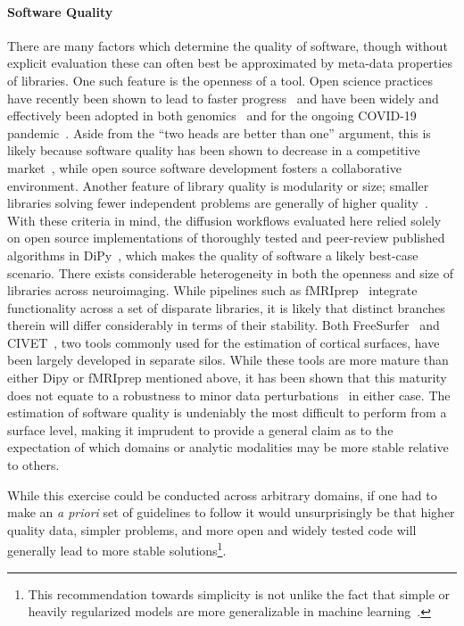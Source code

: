 \paragraph{Software Quality}
There are many factors which determine the quality of software, though without explicit evaluation these can often
best be approximated by meta-data properties of libraries. One such feature is the openness of a tool. Open science
practices have recently been shown to lead to faster progress~\cite{munafo2017manifesto} and have been widely and
effectively been adopted in both genomics~\cite{goecks2010galaxy} and for the ongoing COVID-19
pandemic~\cite{besanccon2020open}. Aside from the ``two heads are better than one'' argument, this is likely
because software quality has been shown to decrease in a competitive market~\cite{raghunathan2005open}, while open
source software development fosters a collaborative environment. Another feature of library quality is modularity
or size; smaller libraries solving fewer independent problems are generally of higher
quality~\cite{raghunathan2005open}. With these criteria in mind, the diffusion workflows evaluated here relied
solely on open source implementations of thoroughly tested and peer-review published
algorithms in DiPy~\cite{Garyfallidis2014-ql,Garyfallidis2012-gg}, which makes the quality of software a likely
best-case scenario. There exists considerable heterogeneity in both the openness and size of libraries across
neuroimaging. While pipelines such as fMRIprep~\cite{esteban2019fmriprep} integrate functionality across a set of
disparate libraries, it is likely that distinct branches therein will differ considerably in terms of their
stability. Both FreeSurfer~\cite{fischl2012freesurfer} and CIVET~\cite{lepage2017human}, two tools commonly used
for the estimation of cortical surfaces, have been largely developed in separate silos. While these tools are more
mature than either Dipy or fMRIprep mentioned above, it has been shown that this maturity does not equate to a
robustness to minor data perturbations~\cite{Lewis2017-ll} in either case. The estimation of software quality is
undeniably the most difficult to perform from a surface level, making it imprudent to provide a general claim as
to the expectation of which domains or analytic modalities may be more stable relative to others.

While this exercise could be conducted across arbitrary domains, if one had to make an \textit{a priori} set of
guidelines to follow it would unsurprisingly be that higher quality data, simpler problems, and more open and
widely tested code will generally lead to more stable solutions\footnote{This recommendation towards simplicity
is not unlike the fact that simple or heavily regularized models are more generalizable in machine
learning~\cite{lever2016regularization}.}.


